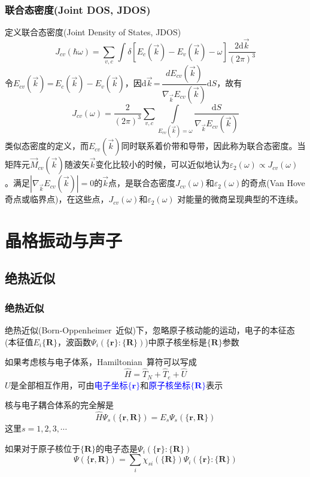 \documentclass[cjk,slidestop,compress,mathserif,blue]{beamer}
\begin{document}
\frame
{
	\frametitle{联合态密度\textrm{(Joint DOS, JDOS)}}
定义联合态密度(\textrm{Joint Density of States, JDOS})
\begin{displaymath}
  J_{cv}(\hbar\omega)=\sum_{v,c}\int\delta[E_c(\vec k)-E_v(\vec k)-\omega]\frac{2\textrm{d}\vec k}{(2\pi)^3}
  \label{eq:optic-33}
\end{displaymath}
令$E_{cv}(\vec k)$\,=\,$E_c(\vec k)-E_v(\vec k)$，因$\textrm{d}\vec k$\,=\,$\dfrac{dE_{cv}(\vec k)}{\nabla_{\vec k}E_{cv}(\vec k)}\textrm{d}S$，故有
\begin{displaymath}
  J_{cv}(\omega)=\frac2{(2\pi)^3}\sum_{v,c}\int\limits_{E_{cv}(\vec k)=\omega}\frac{\textrm{d}S}{\nabla_{\vec k}E_{cv}(\vec k)}
  \label{eq:optic-34}
\end{displaymath}
类似态密度的定义，而$E_{cv}(\vec k)$同时联系着价带和导带，因此称为联合态密度。当矩阵元$\vec M_{cv}(\vec k)$随波矢$\vec k$变化比较小的时候，可以近似地认为$\varepsilon_2(\omega)\!\propto\!J_{cv}(\omega)$。满足$|\nabla_{\vec k}E_{cv}(\vec k)|\!=\!0$的$\vec k$点，是联合态密度$J_{cv}(\omega)$和$\varepsilon_2(\omega)$的奇点(\textrm{Van Hove}奇点或临界点)，在这些点，$J_{cv}(\omega)$和$\varepsilon_2(\omega)$%
对能量的微商呈现典型的不连续。%
}

\section{晶格振动与声子}
\subsection{绝热近似}
\frame
{
	\frametitle{绝热近似}
	绝热近似(\textrm{Born-Oppenheimer~}近似)下，忽略原子核动能的运动，电子的本征态(本征值$E_i\{\mathbf{R}\}$，波函数$\Psi_i(\{\mathbf{r}\}:\{\mathbf{R}\})$)中原子核坐标是$\{\mathbf{R}\}$参数

	如果考虑核与电子体系，\textrm{Hamiltonian~}算符可以写成
	\begin{displaymath}
		\hat H=\hat T_N+\hat T_e+\hat U
	\end{displaymath}
	$U$是全部相互作用，可由\textcolor{blue}{电子坐标$\{\mathbf{r}\}$}和\textcolor{blue}{原子核坐标$\{\mathbf{R}\}$}表示

	核与电子耦合体系的完全解是
	\begin{displaymath}
		\hat H\Psi_s(\{\mathbf{r},\mathbf{R}\})=E_s\Psi_s(\{\mathbf{r},\mathbf{R}\})
	\end{displaymath}
	这里$s=1,2,3,\cdots$

	如果对于原子核位于$\{\mathbf{R}\}$的电子态是$\Psi_i(\{\mathbf{r}\}:\{\mathbf{R}\})$
	\begin{displaymath}
		\Psi(\{\mathbf{r},\mathbf{R}\})=\sum_i\chi_{si}(\{\mathbf{R}\})\Psi_i(\{\mathbf{r}\}:\{\mathbf{R}\})
	\end{displaymath}
}
\end{document}
